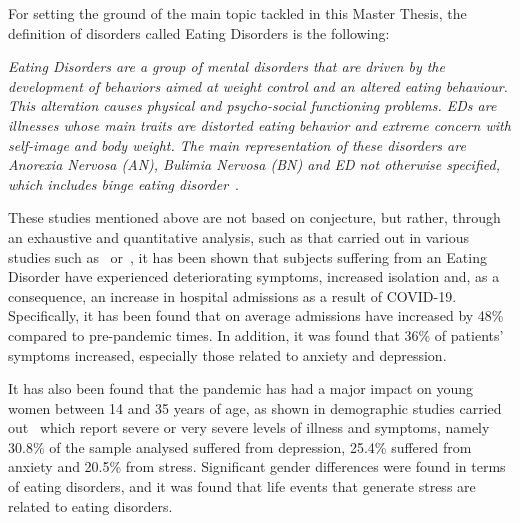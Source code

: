 
For setting the ground of the main topic tackled in this Master Thesis, the definition of disorders called Eating Disorders is the following:  

\textit{Eating Disorders are a group of mental disorders that are driven by the development of behaviors aimed at weight control and an altered eating behaviour. This alteration causes physical and psycho-social functioning problems. EDs are illnesses whose main traits are distorted eating behavior and extreme concern with self-image and body weight. The main representation of these disorders are Anorexia Nervosa (AN), Bulimia Nervosa (BN) and ED not otherwise specified, which includes binge eating disorder}~\cite{baldares2013trastornos}.




These studies mentioned above are not based on conjecture, but rather, through an exhaustive and quantitative analysis, such as that carried out in various studies such as~\cite{j2022impact} or~\cite{vall2021impacto}, it has been shown that subjects suffering from an Eating Disorder have experienced deteriorating symptoms, increased isolation and, as a consequence, an increase in hospital admissions as a result of COVID-19. Specifically, it has been found that on average admissions have increased by 48\% compared to pre-pandemic times. In addition, it was found that 36\% of patients' symptoms increased, especially those related to anxiety and depression.

It has also been found that the pandemic has had a major impact on young women between 14 and 35 years of age, as shown in demographic studies carried out~\cite{vall2021impacto} which report severe or very severe levels of illness and symptoms, namely 30.8\% of the sample analysed suffered from depression, 25.4\% suffered from anxiety and 20.5\% from stress. Significant gender differences were found in terms of eating disorders, and it was found that life events that generate stress are related to eating disorders.

